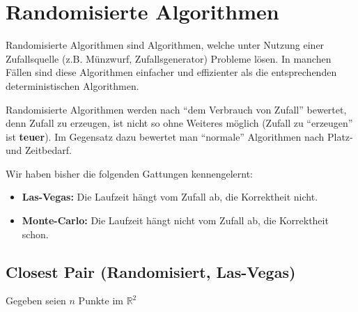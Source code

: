 \documentclass{scrartcl}%
\begin{document}
    \section*{Randomisierte Algorithmen}
    \label{sec:randomisierteAlgorithmen}

    Randomisierte Algorithmen sind Algorithmen,
    welche unter Nutzung einer Zufallsquelle (z.B. Münzwurf, Zufallsgenerator) Probleme lösen.
    In manchen Fällen sind diese Algorithmen einfacher und effizienter
    als die entsprechenden deterministischen Algorithmen.

    Randomisierte Algorithmen werden nach "`dem Verbrauch von Zufall"' bewertet,
    denn Zufall zu erzeugen, ist nicht so ohne Weiteres möglich (Zufall zu "`erzeugen"' ist \textbf{teuer}).
    Im Gegensatz dazu bewertet man "`normale"' Algorithmen nach Platz- und Zeitbedarf.

    Wir haben bisher die folgenden Gattungen kennengelernt:

    \begin{itemize}
        \item \textbf{\textsf{Las-Vegas:}} Die Laufzeit hängt vom Zufall ab, die Korrektheit nicht.
        \item \textbf{\textsf{Monte-Carlo:}} Die Laufzeit hängt nicht vom Zufall ab, die Korrektheit schon.
    \end{itemize}

    \subsection*{Closest Pair (Randomisiert, Las-Vegas)}
    \label{subsec:closestPairrandomisiert,LasVegas}

    Gegeben seien $n$ Punkte im $\mathbb{R}^2$

    \begin{figure}[htb]
        \centering


    \end{figure}
\end{document}
